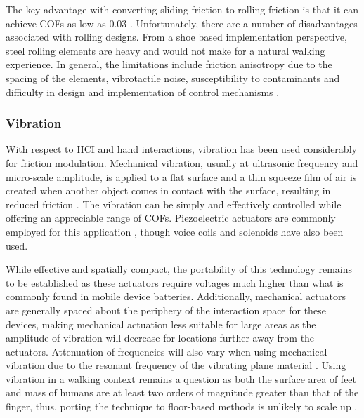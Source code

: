 \documentclass [12pt,letterpaper]{report}
\begin{document}
The key advantage with converting sliding friction to rolling friction is that it can achieve COFs as low as 0.03 \cite{millet2013vibration}. Unfortunately, there are a number of disadvantages associated with rolling designs. From a shoe based implementation perspective, steel rolling elements are heavy and would not make for a natural walking experience. In general, the limitations include friction anisotropy due to the spacing of the elements, vibrotactile noise, susceptibility to contaminants and difficulty in design and implementation of control mechanisms \cite{millet2016design}.



\subsubsection{Vibration}
\label{vib}

With respect to HCI and hand interactions, vibration has been used considerably for friction modulation. Mechanical vibration, usually at ultrasonic frequency and micro-scale amplitude, is applied to a flat surface and a thin squeeze film of air is created when another object comes in contact with the surface, resulting in reduced friction \cite{winfield2007t,amberg2011stimtac}. The vibration can be simply and effectively controlled while offering an appreciable range of COFs. Piezoelectric actuators are commonly employed for this application  \cite{watanabe1995method,nara2001surface,biet2006piezoelectric,winfield2007t,amberg2011stimtac,levesque2011enhancing}, though voice coils and solenoids \cite{bau2010teslatouch} have also been used.

While effective and spatially compact, the portability of this technology remains to be established as these actuators require voltages much higher than what is commonly found in mobile device batteries. Additionally, mechanical actuators are generally spaced about the periphery of the interaction space for these devices, making mechanical actuation less suitable for large areas as the amplitude of vibration will decrease for locations further away from the actuators. Attenuation of frequencies will also vary when using mechanical vibration due to the resonant frequency of the vibrating plane material \cite{bau2010teslatouch}. Using vibration in a walking context remains a question as both the surface area of feet and mass of humans are at least two orders of magnitude greater than that of the finger, thus, porting the technique to floor-based methods is unlikely to scale up \cite{millet2016design}.
\end{document}
